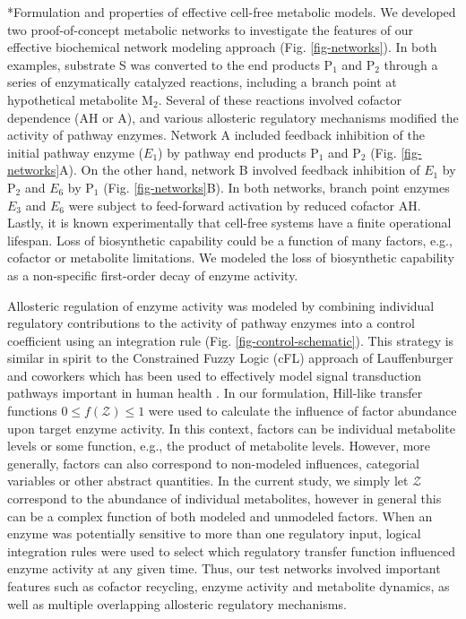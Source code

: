 \documentclass[12pt]{article}
\makeatletter
\renewcommand\subsection{\@startsection
	{subsection}{2}{0mm}
	{-0.05in}
	{-0.5\baselineskip}
	{\normalfont\normalsize\bfseries}}
\makeatother
\begin{document}
\subsection*{Formulation and properties of effective cell-free metabolic models.}
We developed two proof-of-concept metabolic networks to investigate the features of our effective biochemical network modeling approach (Fig. \ref{fig-networks}). 
In both examples, substrate S was converted to the end products P$_{1}$ and P$_{2}$ through a series of enzymatically catalyzed reactions, including a branch point at hypothetical metabolite M$_{2}$. 
Several of these reactions involved cofactor dependence (AH or A), and various allosteric regulatory mechanisms modified the activity of pathway enzymes. 
Network A included feedback inhibition of the initial pathway enzyme ($E_{1}$) by pathway end products P$_{1}$ and P$_{2}$ (Fig. \ref{fig-networks}A). 
On the other hand, network B involved feedback inhibition of $E_{1}$ by P$_{2}$ and $E_{6}$ by P$_{1}$ (Fig. \ref{fig-networks}B). 
In both networks, branch point enzymes $E_{3}$ and $E_{6}$ were subject to feed-forward activation by reduced cofactor AH. 
Lastly, it is known experimentally that cell-free systems have a finite operational lifespan. 
Loss of biosynthetic capability could be a function of many factors, e.g., cofactor or metabolite limitations. 
We modeled the loss of biosynthetic capability as a non-specific first-order decay of enzyme activity.

Allosteric regulation of enzyme activity was modeled by combining individual regulatory contributions to the activity of pathway enzymes into a control coefficient using an integration rule (Fig. \ref{fig-control-schematic}).  
This strategy is similar in spirit to the Constrained Fuzzy Logic (cFL) approach of Lauffenburger and coworkers which has been used to effectively model signal transduction pathways important in human health \citep{Morris:2011aa}. 
In our formulation, Hill-like transfer functions $0 \leq f\left(\mathcal{Z}\right) \leq 1$ were used to calculate the influence of factor abundance upon target enzyme activity. 
In this context, factors can be individual metabolite levels or some function, e.g., the product of metabolite levels. 
However, more generally, factors can also correspond to non-modeled influences, categorial variables or other abstract quantities. 
In the current study, we simply let $\mathcal{Z}$ correspond to the abundance of individual metabolites, however in general this can be a complex function of both modeled and unmodeled factors. 
When an enzyme was potentially sensitive to more than one regulatory input, logical integration rules were used to select which regulatory transfer function influenced enzyme activity at any given time. 
Thus, our test networks involved important features such as cofactor recycling, enzyme activity and metabolite dynamics, as well as multiple overlapping allosteric regulatory mechanisms.  
\end{document}
